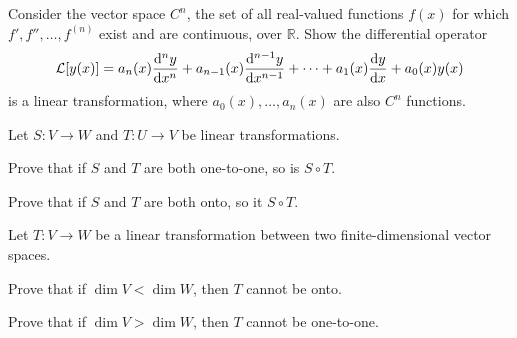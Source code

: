 \documentclass[boxes]{gsypset}
\begin{document}

\begin{problem}
	Consider the vector space $C^n$, the set of all real-valued
	functions $f(x)$ for which $f',f'',\dots,f^{(n)}$ exist and are
	continuous, over $\mathbb{R}$. Show the differential operator
	\[
		\mathcal{L}[y(x)]=a_n(x)\df[n]{y}{x}+a_{n-1}(x)\df[n-1]{y}{x}+
		\dots+a_1(x)\df{y}{x}+a_0(x)y(x)
	\]
	is a linear transformation, where $a_0(x),\dots,a_n(x)$ are also
	$C^n$ functions.
\end{problem}
\begin{solution}
	
\end{solution}
\newpage

\begin{problem}[6.5.33]
	Let $S:V\to W$ and $T:U\to V$ be linear transformations.
	\begin{subproblems}
		\subproblem Prove that if $S$ and $T$ are both one-to-one, so is $S\circ T$.
			\begin{solution}
				
			\end{solution}
			
		\subproblem Prove that if $S$ and $T$ are both onto, so it $S\circ T$.
			\begin{solution}
				
			\end{solution}
	\end{subproblems}
\end{problem}

\begin{problem}[6.5.35]
	Let $T:V\to W$ be a linear transformation between two
	finite-dimensional vector spaces.
	\begin{subproblems}
		\subproblem Prove that if $\dim V<\dim W$, then $T$ cannot be onto.
			\begin{solution}
				
			\end{solution}
			
		\subproblem Prove that if $\dim V>\dim W$, then $T$ cannot be one-to-one.
			\begin{solution}
				
			\end{solution}
	\end{subproblems}
\end{problem}
\end{document}
